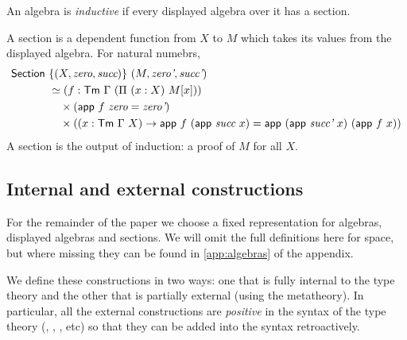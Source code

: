 \begin{definition}
An algebra is \emph{inductive} if every displayed algebra over it has a section.
\end{definition}
A section is a dependent function from $X$ to $M$ which takes its values from
the displayed algebra. For natural numebrs,
\begin{align*}
	\mta{Section}\  & \{(X, \textit{zero}, \textit{succ})\}\ (M, \textit{zero'}, \textit{succ'})                                                                                           \\
	                & \simeq (f : \Tm\ \Gamma\ (\Pi\ (x : X)\ M[x]))                                                                                   \\
	                & \quad \times (\mta{app}\ f\ \textit{zero} = \textit{zero'})                                                                                        \\
	                & \quad \times ((x : \Tm\ \Gamma\ X) \to \mta{app}\ f\ (\mta{app}\ \textit{succ}\ x) = \mta{app}\ (\mta{app}\ \textit{succ'}\ x)\ (\mta{app}\ f\ x))
\end{align*}
A section is the output of induction: a proof of $M$ for all $X$.

\subsection{Internal and external constructions}

For the remainder of the paper we choose a fixed representation for algebras,
displayed algebras and sections. We will omit the full definitions here for
space, but where missing they can be found in \cref{app:algebras} of the appendix.

We define these constructions in two ways: one that is fully internal to the
type theory and the other that is partially external (using the metatheory).
In particular, all the external constructions are \emph{positive} in the
syntax of the type theory (, , , etc) so that
they can be added into the syntax retroactively.

